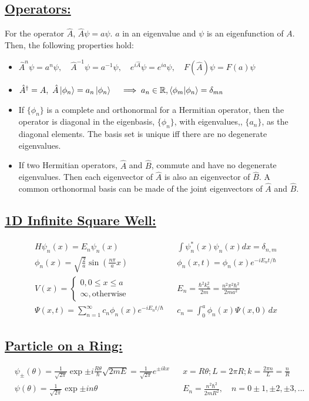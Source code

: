 \documentclass[a4paper,12pt]{article}
\begin{document}
\subsection*{\underline{Operators:}}
For the operator $\hat{A}$, $\hat{A}\psi=a\psi$. $a$ in an eigenvalue and $\psi$ is an eigenfunction of $A$. Then, the following properties hold:
\begin{itemize}
    \item $\hat{A}^n\psi=a^n\psi,\quad \hat{A}^{-1}\psi=a^{-1}\psi,\quad e^{i\hat{A}}\psi=e^{ia}\psi,\quad F(\hat{A})\psi=F(a)\psi$
    \item $\hat{A}^{\dagger}=A,\ \hat{A}\ket{\phi_n}=a_n\ket{\phi_n} \quad \implies a_n\in \mathbb{R}, \braket{\phi_m|\phi_n}=\delta_{mn}$
    \item If $\{\phi_n\}$ is a complete and orthonormal for a Hermitian operator, then the operator is diagonal in the eigenbasis, $\{\phi_n\}$, with eigenvalues,, $\{a_n\}$, as the diagonal elements. The basis set is unique iff there are no degenerate eigenvalues.
    \item If two Hermitian operators, $\hat{A}$ and $\hat{B}$, commute and have no degenerate eigenvalues. Then each eigenvector of $\hat{A}$ is also an eigenvector of $\hat{B}$. A common orthonormal basis can be made of the joint eigenvectors of $\hat{A}$ and $\hat{B}$.
\end{itemize}
\subsection*{\underline{1D Infinite Square Well:}}
\begin{align}
    &H\psi_n(x)=E_n\psi_n(x)
    &
    &\int\psi^*_n(x)\psi_n(x)dx=\delta_{n,m}
    \\
    &\phi_n(x)=\sqrt{\frac{2}{a}}\sin\left( \frac{n\pi}{a}x \right)
    &
    &\phi_n(x,t)=\phi_n(x)e^{-iE_nt/\hbar}
    \\
    &V(x)=\left\{\begin{matrix}0, 0\leq x\leq a\\\infty, \mathrm{otherwise}\end{matrix}\right.
    &
    &E_n=\frac{\hbar^2k_n^2}{2m}=\frac{n^2\pi^2\hbar^2}{2ma^2}
    \\
    &\Psi(x,t)=\sum_{n=1}^\infty c_n\phi_n(x)e^{-iE_nt/\hbar}
    &
    &c_n=\int_0^a\phi_n(x)\Psi(x,0)\,dx
\end{align}
\subsection*{\underline{Particle on a Ring:}}
\begin{align}
    &\psi_\pm(\theta)=\frac{1}{\sqrt{2\pi}}\exp{\pm i\frac{R\theta}{\hbar}\sqrt{2mE}}=\frac{1}{\sqrt{2\pi}}e^{\pm ikx}
    &
    &x=R\theta; L=2\pi R; k=\frac{2\pi n}{L}=\frac{n}{R}
    \\
    &\psi(\theta)=\frac{1}{\sqrt{2\pi}}\exp{\pm in\theta}
    &
    &E_n=\frac{n^2\hbar^2}{2mR^2},\quad n=0\pm 1,\pm 2,\pm 3,...
\end{align}
\end{document}
